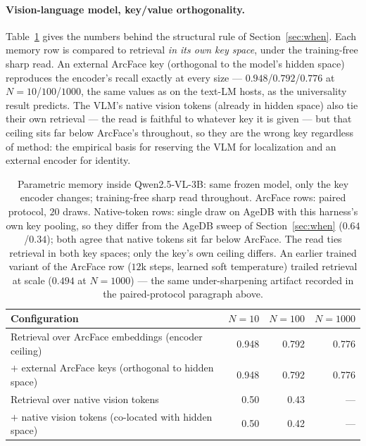 \paragraph{Vision-language model, key/value orthogonality.} Table~\ref{tab:vlm} gives the numbers behind the structural rule of Section~\ref{sec:when}. Each memory row is compared to retrieval \emph{in its own key space}, under the training-free sharp read. An external ArcFace key (orthogonal to the model's hidden space) reproduces the encoder's recall exactly at every size --- $0.948$/$0.792$/$0.776$ at $N{=}10$/$100$/$1000$, the same values as on the text-LM hosts, as the universality result predicts. The VLM's native vision tokens (already in hidden space) also tie their own retrieval --- the read is faithful to whatever key it is given --- but that ceiling sits far below ArcFace's throughout, so they are the wrong key regardless of method: the empirical basis for reserving the VLM for localization and an external encoder for identity.

\begin{table}[h]
\small\centering
\caption{Parametric memory inside Qwen2.5-VL-3B: same frozen model, only the key encoder changes; training-free sharp read throughout. ArcFace rows: paired protocol, $20$ draws. Native-token rows: single draw on AgeDB with this harness's own key pooling, so they differ from the AgeDB sweep of Section~\ref{sec:when} ($0.64$/$0.34$); both agree that native tokens sit far below ArcFace. The read ties retrieval in both key spaces; only the key's own ceiling differs. An earlier trained variant of the ArcFace row ($12$k steps, learned soft temperature) trailed retrieval at scale ($0.494$ at $N{=}1000$) --- the same under-sharpening artifact recorded in the paired-protocol paragraph above.}
\label{tab:vlm}
\begin{tabular}{@{}lrrr@{}}
\toprule
\textbf{Configuration} & $N{=}10$ & $N{=}100$ & $N{=}1000$ \\
\midrule
Retrieval over ArcFace embeddings (encoder ceiling) & 0.948 & 0.792 & 0.776 \\
\attmem{} $+$ external ArcFace keys (orthogonal to hidden space) & 0.948 & 0.792 & 0.776 \\
\midrule
Retrieval over native vision tokens & 0.50 & 0.43 & --- \\
\attmem{} $+$ native vision tokens (co-located with hidden space) & 0.50 & 0.42 & --- \\
\bottomrule
\end{tabular}
\end{table}

